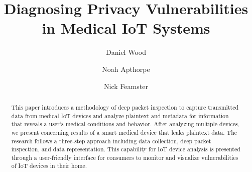 \documentclass[sigconf]{acmart}
\begin{document}
\title{Diagnosing Privacy Vulnerabilities in Medical IoT Systems} %
\author{Daniel Wood}
\author{Noah Apthorpe}
\author{Nick Feamster}

\renewcommand{\shortauthors}{D. Wood et al.}


\begin{abstract}
This paper introduces a methodology of deep packet inspection to capture transmitted data from medical IoT devices and analyze plaintext and metadata for information that reveals a user's medical conditions and behavior. After analyzing multiple devices, we present concerning results of a smart medical device that leaks plaintext data. The research follows a three-step approach including data collection, deep packet inspection, and data representation. This capability for IoT device analysis is presented through a user-friendly interface for consumers to monitor and visualize vulnerabilities of IoT devices in their home. 
\end{abstract}


\maketitle




\end{document}
